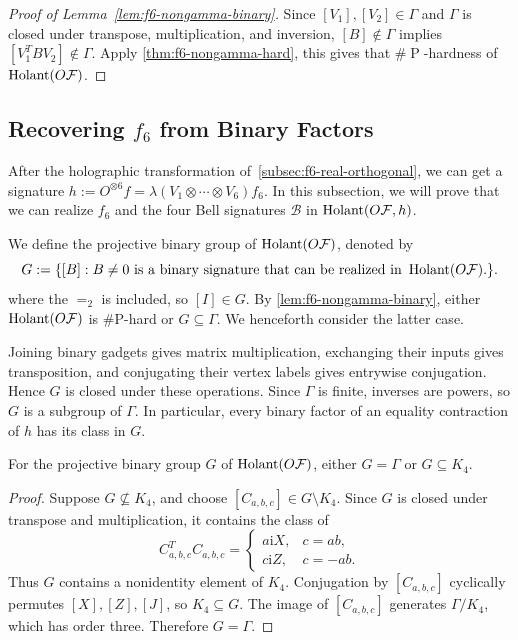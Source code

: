 \begin{proof}[Proof of Lemma~\ref{lem:f6-nongamma-binary}]
Since $[V_1],[V_2]\in\Gamma$ and $\Gamma$ is closed under transpose,
multiplication, and inversion, $[B]\notin\Gamma$ implies
$[V_1^TBV_2]\notin\Gamma$.
Apply \cref{thm:f6-nongamma-hard},
this gives that $\#\operatorname{P}$-hardness of $\operatorname{Holant}(O\mathcal{F})$.
\end{proof}




\subsection{Recovering \texorpdfstring{$f_6$}{f6} from Binary Factors}
\label{subsec:f6-binary-factors}
After the holographic transformation of~\cref{subsec:f6-real-orthogonal}, we can get a signature $h:=O^{\otimes6}f=\lambda(V_1\otimes\cdots\otimes V_6)f_6$. In this subsection, we will prove that we can realize $f_6$ and the four Bell signatures $\mathcal B$ in $\operatorname{Holant}(O\mathcal{F},h)$. 

We define the projective binary group of $\operatorname{Holant}(O\mathcal{F})$, denoted by
\begin{equation}
 G:=\{[B]: B\ne 0 \text{ is a binary signature that can be realized in }\operatorname{Holant}(O\mathcal{F}).\}.
\end{equation}
where the $=_2$ is included, so $[I]\in G$.
By \cref{lem:f6-nongamma-binary}, either
$\operatorname{Holant}(O\mathcal F)$ is $\#\mathrm P$-hard or $G\subseteq\Gamma$.
We henceforth consider the latter case.

Joining binary gadgets gives matrix multiplication, exchanging their
inputs gives transposition, and conjugating their vertex labels gives
entrywise conjugation. Hence $G$ is closed under these operations.
Since $\Gamma$ is finite, inverses are powers, so $G$ is a subgroup
of $\Gamma$. In particular, every binary factor of an equality
contraction of $h$ has its class in $G$.

\begin{lemma}
\label{lem:f6-group-alternatives}
For the projective binary group $G$ of $\operatorname{Holant}(O\mathcal{F})$, either
$G=\Gamma$ or $G\subseteq K_4$.
\end{lemma}

\begin{proof}
Suppose $G\nsubseteq K_4$, and choose
$[C_{a,b,c}]\in G\setminus K_4$.
Since $G$ is closed under transpose and multiplication, it contains
the class of
\[
C_{a,b,c}^TC_{a,b,c}
=\begin{cases}
a\mathrm iX,&c=ab,\\
c\mathrm iZ,&c=-ab.
\end{cases}
\]
Thus $G$ contains a nonidentity element of $K_4$.
Conjugation by $[C_{a,b,c}]$ cyclically permutes
$[X],[Z],[J]$, so $K_4\subseteq G$.
The image of $[C_{a,b,c}]$ generates $\Gamma/K_4$, which has
order three. Therefore $G=\Gamma$.
\end{proof}

